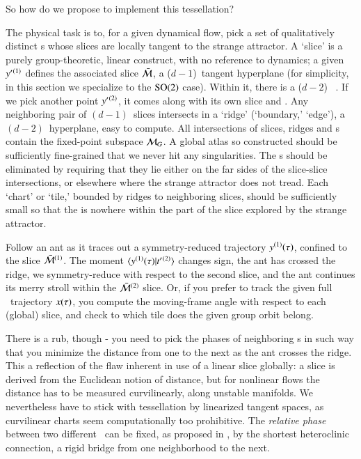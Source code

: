 \documentclass[preprint,12pt]{elsarticle} %
\begin{document}
So how do we propose to implement this tessellation?

The physical task is to, for a given dynamical flow, pick a set of
qualitatively distinct {\template s} whose slices are locally tangent to
the strange attractor. A `slice' is a purely group-theoretic, linear
construct, with no reference to dynamics; a given {\template}
${y'}{}^{(1)}$ defines the associated slice $\bar{\cal M}$, a
($d\!-\!1$)\dmn\ tangent hyperplane (for simplicity, in this section we
specialize to the $\textrm{SO}(2)$ case). Within it, there is a ($d\!-\!2$)\dmn\
{\sset} . If we pick another {\template} point
${y'}{}^{(2)}$, it comes along with its own slice and {\sset}. Any
neighboring pair of $(d\!-\!1)$\dmn\ slices intersects in a `ridge'
(`boundary,' `edge'), a $(d\!-\!2)$\dmn\ hyperplane, easy to compute. All
intersections of slices, ridges and {\sset s} contain the fixed-point
subspace ${\cal M}_{G}$. A global atlas so constructed should be sufficiently
fine-grained that we never hit any {\sset} singularities. The {\sset}s
should be eliminated by requiring that they lie either on the far sides
of the slice-slice intersections, or elsewhere where the strange
attractor does not tread. Each `chart' or `tile,' bounded by ridges to
neighboring slices, should be sufficiently small so that the {\sset} is
nowhere within the part of the slice explored by the strange attractor.

Follow an ant as it traces out a symmetry-reduced trajectory
$y{}^{(1)}(\tau)$, confined to the slice $\bar{\cal M}{}^{(1)}$. The
moment $\braket{\sspRed{}^{(1)}(\tau)}{\sliceTan{}{}^{(2)}}$ changes
sign, the ant has crossed the ridge, we symmetry-reduce with respect to
the second slice, and the ant continues its merry stroll within the
$\bar{\cal M}{}^{(2)}$ slice. Or, if you prefer to track the  given full
\statesp\ trajectory $x(\tau)$, you compute the moving-frame angle
with respect to each (global) slice, and check to which tile does the
given group orbit belong.

There is a rub, though - you need to pick the phases of neighboring
{\template s} in such way that you minimize the distance from one to the
next as the ant crosses the ridge. This a reflection of the flaw inherent in use
of a linear slice globally: a slice is derived from the Euclidean
notion of distance, but for nonlinear flows the distance has to be
measured curvilinearly, along unstable
manifolds. We nevertheless have to stick with tessellation by
linearized tangent spaces, as curvilinear charts seem computationally too
prohibitive. The {\em relative phase} between two
different \reqva\ can be fixed, as proposed in , by the
shortest heteroclinic connection, a rigid bridge from one
neighborhood to the next.
\end{document}
